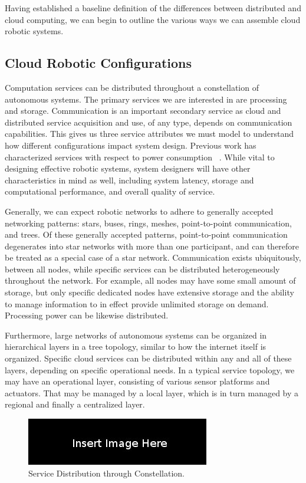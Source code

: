 \documentclass{sig-alternate}
\begin{document}
Having established a baseline definition of the differences between distributed and cloud computing, we can begin to outline the various ways we can assemble cloud robotic systems.

\subsection{Cloud Robotic Configurations}
Computation services can be distributed throughout a constellation of autonomous systems.  The primary services we are interested in are processing and storage.  Communication is an important secondary service as cloud and distributed service acquisition and use, of any type, depends on communication capabilities.  This gives us three service attributes we must model to understand how different configurations impact system design.  Previous work has characterized services with respect to power consumption ~\cite{HuTaWe:12}.  While vital to designing effective robotic systems, system designers will have other characteristics in mind as well, including system latency, storage and computational performance, and overall quality of service.

Generally, we can expect robotic networks to adhere to generally accepted networking patterns: stars, buses, rings, meshes, point-to-point communication, and trees.  Of these generally accepted patterns, point-to-point communication degenerates into star networks with more than one participant, and can therefore be treated as a special case of a star network.  Communication exists ubiquitously, between all nodes, while specific services can be distributed heterogeneously throughout the network.  For example, all nodes may have some small amount of storage, but only specific dedicated nodes have extensive storage and the ability to manage information to in effect provide unlimited storage on demand.  Processing power can be likewise distributed.

Furthermore, large networks of autonomous systems can be organized in hierarchical layers in a tree topology, similar to how the internet itself is organized.  Specific cloud services can be distributed within any and all of these layers, depending on specific operational needs.  In a typical service topology, we may have an operational layer, consisting of various sensor platforms and actuators.  That may be managed by a local layer, which is in turn managed by a regional and finally a centralized layer.

\begin{figure}[!h]
\centering
\includegraphics[width=.49\textwidth]{blank}
\caption{Service Distribution through Constellation.}
\label{fig:example1}
\end{figure}
\end{document}

